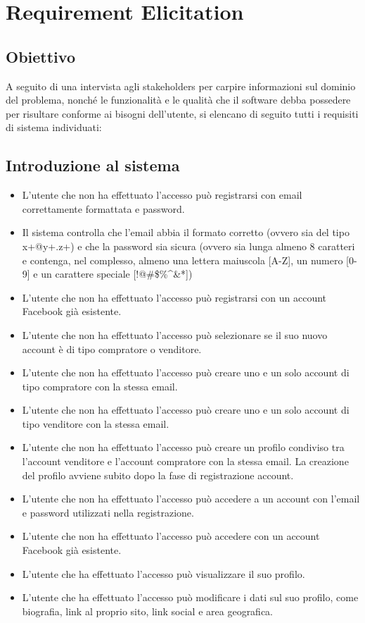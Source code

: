 
\chapter{Requirement Elicitation}
    \section{Obiettivo}
        A seguito di una intervista agli stakeholders per carpire informazioni sul dominio del problema, nonché le funzionalità e le qualità che il software debba possedere per risultare conforme ai bisogni dell'utente, si elencano di seguito tutti i requisiti di sistema individuati:
    \section{Introduzione al sistema} %
        \begin{itemize}
            \item L'utente che non ha effettuato l'accesso può registrarsi con email correttamente formattata e password.
            \item Il sistema controlla che l'email abbia il formato corretto (ovvero sia del tipo x+@y+.z+) e che la password sia sicura (ovvero sia lunga almeno 8 caratteri e contenga, nel complesso, almeno una lettera maiuscola [A-Z], un numero [0-9] e un carattere speciale [!@\#\$\%\^{}\&*])
            \item L'utente che non ha effettuato l'accesso può registrarsi con un account Facebook già esistente.
            \item L'utente che non ha effettuato l'accesso può selezionare se il suo nuovo account è di tipo compratore o venditore.
            \item L'utente che non ha effettuato l'accesso può creare uno e un solo account di tipo compratore con la stessa email.
            \item L'utente che non ha effettuato l'accesso può creare uno e un solo account di tipo venditore con la stessa email.
            \item L'utente che non ha effettuato l'accesso può creare un profilo condiviso tra l'account venditore e l'account compratore con la stessa email. La creazione del profilo avviene subito dopo la fase di registrazione account.
            \item L'utente che non ha effettuato l'accesso può accedere a un account con l'email e password utilizzati nella registrazione.
            \item L'utente che non ha effettuato l'accesso può accedere con un account Facebook già esistente.
            \item L'utente che ha effettuato l'accesso può visualizzare il suo profilo.
            \item L'utente che ha effettuato l'accesso può modificare i dati sul suo profilo, come biografia, link al proprio sito, link social e area geografica.
        \end{itemize}
